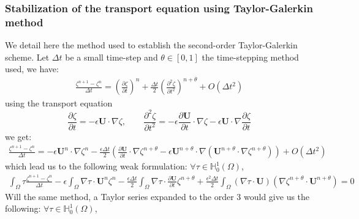 \documentclass[11pt,a4paper]{article}
\begin{document}
\subsubsection{Stabilization of the transport equation using Taylor-Galerkin method}
	We detail here the method used to establish the second-order Taylor-Galerkin scheme. Let $\Delta t$ be a small time-step and $\theta \in [0,1]$ the time-stepping method used, we have:	
	\begin{align}
		\displaystyle \frac{\zeta^{n+1} - \zeta^n}{\Delta t} = \left(\frac{\partial \zeta}{\partial t} \right)^n + \frac{\Delta t}{2} \left(\frac{\partial^2 \zeta}{\partial t^2} \right)^{n+\theta} + O(\Delta t^2)
	\end{align}
	using the transport equation
	\begin{equation}
		\displaystyle \frac{\partial \zeta}{\partial t} = - \epsilon \mathbf{U} \cdot \nabla \zeta, \qquad \displaystyle \frac{\partial^2 \zeta}{\partial t^2} = - \epsilon \frac{\partial \mathbf{U}}{\partial t} \cdot \nabla \zeta - \epsilon \mathbf{U} \cdot \nabla \frac{\partial \zeta}{\partial t}
	\end{equation}
	we get:
	\begin{align}
		\displaystyle \frac{\zeta^{n+1} - \zeta^n}{\Delta t} =- \epsilon \mathbf{U}^n \cdot \nabla \zeta^n - \frac{\epsilon \Delta t}{2} \left(\frac{\partial \mathbf{U}}{\partial t} \cdot \nabla \zeta^{n+\theta} - \epsilon \mathbf{U}^{n+\theta} \cdot \nabla (\mathbf{U}^{n+\theta} \cdot \nabla \zeta^{n+\theta})\right) + O(\Delta t^2)
	\end{align}
	which lead us to the following weak formulation: $\forall \tau \in \mathbb{H}^1_0(\Omega)$,
	\begin{align}
		\displaystyle \int_{\Omega}{\! \tau \frac{\zeta^{n+1} - \zeta^n}{\Delta t}}  -   \epsilon \int_{\Omega}{\! \nabla \tau \cdot  \mathbf{U}^n  \zeta^n} - \frac{\epsilon \Delta t}{2} \int_{\Omega}{\! \nabla \tau \cdot \frac{\partial \mathbf{U}}{\partial t} \zeta^{n+\theta}}
		 +  \frac{\epsilon^2 \Delta t}{2} \int_{\Omega}{\! (\nabla \tau \cdot \mathbf{U})(\nabla \zeta^{n+\theta} \cdot \mathbf{U}^{n+\theta})} = 0
	\end{align}
	Will the same method, a Taylor series expanded to the order 3 would give us the following:  $\forall \tau \in \mathbb{H}^1_0(\Omega)$,
\end{document}
